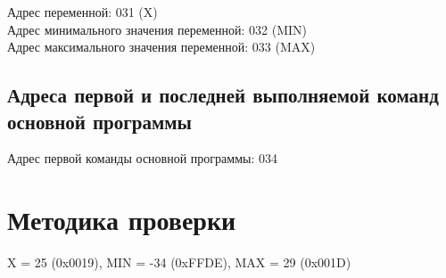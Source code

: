 \noindent Адрес переменной: 031 (X)\\
Адрес минимального значения переменной: 032 (MIN)\\
Адрес максимального значения переменной: 033 (MAX)

\subsection{Адреса первой и последней выполняемой команд основной программы}
\noindent Адрес первой команды основной программы: 034\\

\section{Методика проверки}
X = 25 (0x0019), MIN = -34 (0xFFDE), MAX = 29 (0x001D)
